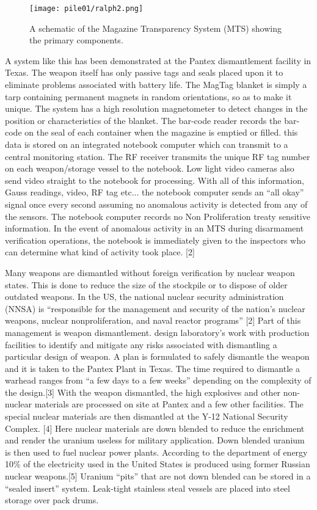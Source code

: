 \documentclass[twoside,titlepage,11pt,twocolumn,a4paper]{article}
\begin{document}
\begin{figure}
  \texttt{[image: pile01/ralph2.png]}
  \caption{A schematic of the Magazine Transparency System (MTS) 
    showing the primary components.}
\end{figure}

A system like this has been demonstrated at the Pantex dismantlement
facility in Texas. The weapon itself has only passive tags and seals
placed upon it to eliminate problems associated with battery life. The
MagTag blanket is simply a tarp containing permanent magnets in random
orientations, so as to make it unique. The system has a high
resolution magnetometer to detect changes in the position or
characteristics of the blanket. The bar-code reader records the
bar-code on the seal of each container when the magazine is emptied or
filled. this data is stored on an integrated notebook computer which
can transmit to a central monitoring station. The RF receiver
transmits the unique RF tag number on each weapon/storage vessel to
the notebook. Low light video cameras also send video straight to the
notebook for processing. With all of this information, Gauss readings,
video, RF tag etc... the notebook computer sends an ``all okay'' signal
once every second assuming no anomalous activity is detected from any
of the sensors. The notebook computer records no Non Proliferation
treaty sensitive information.  In the event of anomalous activity in
an MTS during disarmament verification operations, the notebook is
immediately given to the inspectors who can determine what kind of
activity took place. [2]

Many weapons are dismantled without foreign verification by nuclear
weapon states.  This is done to reduce the size of the stockpile or to
dispose of older outdated weapons.  In the US, the national nuclear
security administration (NNSA) is ``responsible for the management and
security of the nation's nuclear weapons, nuclear nonproliferation,
and naval reactor programs'' [2] Part of this management is weapon
dismantlement. design laboratory's work with production facilities to
identify and mitigate any risks associated with dismantling a
particular design of weapon. A plan is formulated to safely dismantle
the weapon and it is taken to the Pantex Plant in Texas. The time
required to dismantle a warhead ranges from ``a few days to a few
weeks'' depending on the complexity of the design.[3] With the weapon
dismantled, the high explosives and other non-nuclear materials are
processed on site at Pantex and a few other facilities.  The special
nuclear materials are then dismantled at the Y-12 National Security
Complex.  [4] Here nuclear materials are down blended to reduce the
enrichment and render the uranium useless for military
application. Down blended uranium is then used to fuel nuclear power
plants. According to the department of energy 10\% of the electricity
used in the United States is produced using former Russian nuclear
weapons.[5] Uranium ``pits'' that are not down blended can be stored
in a ``sealed insert'' system. Leak-tight stainless steal vessels are
placed into steel storage over pack drums.
\end{document}
